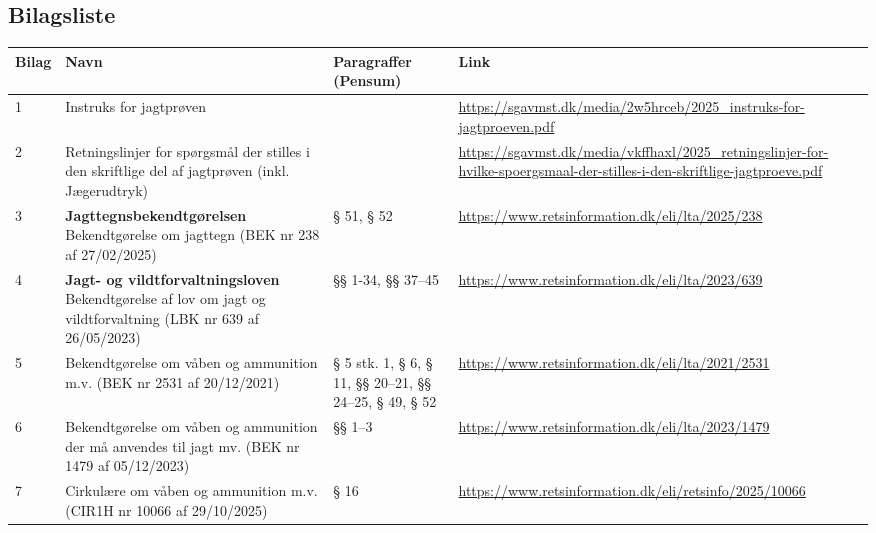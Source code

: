 \documentclass[10pt,a4paper]{article}
\begin{document}
\vspace{1cm}

\subsection*{Bilagsliste}

{\footnotesize %
\setlength{\tabcolsep}{4pt} %
\renewcommand{\arraystretch}{1.3} %

\centering
\begin{tabular}{|P{1.2cm}|P{5.5cm}|P{3.5cm}|P{6.5cm}|}
\hline
\textbf{Bilag} & \textbf{Navn} & \textbf{Paragraffer (Pensum)} & \textbf{Link} \\
\hline

1 & Instruks for jagtprøven & & \url{https://sgavmst.dk/media/2w5hrceb/2025_instruks-for-jagtproeven.pdf} \\
\hline

2 & Retningslinjer for spørgsmål der stilles i den skriftlige del af jagtprøven (inkl. Jægerudtryk) & & \url{https://sgavmst.dk/media/vkffhaxl/2025_retningslinjer-for-hvilke-spoergsmaal-der-stilles-i-den-skriftlige-jagtproeve.pdf} \\
\hline

3 & \textbf{Jagttegnsbekendtgørelsen} Bekendtgørelse om jagttegn (BEK nr 238 af 27/02/2025) & § 51, § 52 & \url{https://www.retsinformation.dk/eli/lta/2025/238} \\
\hline

4 & \textbf{Jagt- og vildtforvaltningsloven} Bekendtgørelse af lov om jagt og vildtforvaltning (LBK nr 639 af 26/05/2023) & §§ 1-34, §§ 37–45 & \url{https://www.retsinformation.dk/eli/lta/2023/639} \\
\hline

5 & Bekendtgørelse om våben og ammunition m.v. (BEK nr 2531 af 20/12/2021) & § 5 stk. 1, § 6, § 11, §§ 20–21, §§ 24–25, § 49, § 52 & \url{https://www.retsinformation.dk/eli/lta/2021/2531} \\
\hline

6 & Bekendtgørelse om våben og ammunition der må anvendes til jagt mv. (BEK nr 1479 af 05/12/2023) & §§ 1–3 & \url{https://www.retsinformation.dk/eli/lta/2023/1479} \\
\hline

7 & Cirkulære om våben og ammunition m.v. (CIR1H nr 10066 af 29/10/2025) & § 16 & \url{https://www.retsinformation.dk/eli/retsinfo/2025/10066} \\
\hline


\end{tabular}}
\end{document}
